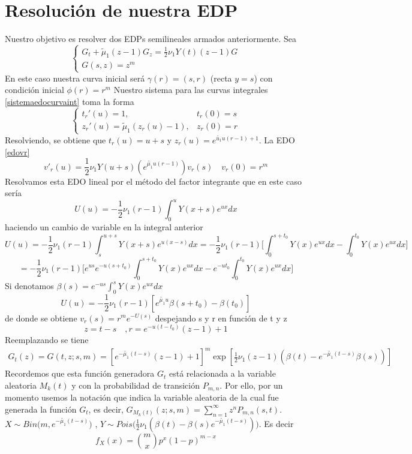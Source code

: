 \section{Resolución de nuestra EDP}
Nuestro objetivo es resolver dos EDPs semilineales armados anteriormente.
Sea 
$$\begin{cases}
    G_t+\tilde{\mu}_1(z-1)G_z=\frac{1}{2}\nu_1Y(t)(z-1)G\\G(s,z)=z^m
\end{cases}$$
En este caso nuestra curva inicial será $\gamma(r)=(s,r)$ (recta $y=s$) con condición inicial $\phi(r)=r^m$
Nuestro sistema para las curvas integrales \ref{sistemaedocurvaint} toma la forma
$$\begin{cases}
    t_r'(u)=1, & t_r(0)=s\\
    z_r'(u)=\tilde{\mu}_1(z_r(u)-1), & z_r(0)=r
\end{cases}$$
Resolviendo, se obtiene que $t_r(u)=u+s$ y $z_r(u)=e^{\tilde{u_1}u(r-1)+1}$.
La EDO \ref{edovr} 
$$v'_r(u)=\frac{1}{2}\nu_1Y(u+s)(e^{\tilde{\mu_1}u(r-1)}) v_r(s)\quad v_r(0)=r^m$$
Resolvamos esta EDO lineal por el método del factor integrante que en este caso sería $$U(u)=-\frac{1}{2}\nu_1(r-1)\int_0^uY(x+s)e^{ux}dx$$
haciendo un cambio de variable en la integral anterior
$$U(u)=-\frac{1}{2}\nu_1(r-1)\int_{s}^{u+s}Y(x+s)e^{u(x-s)}dx=-\frac{1}{2}\nu_1(r-1)\bigg[\int_0^{s+t_0}Y(x)e^{ux}dx-\int_0^{t_0}Y(x)e^{ux}dx\bigg]$$
$$=-\frac{1}{2}\nu_1(r-1)\bigg[e^{us}e^{-u(s+t_0)}\int_0^{s+t_0}Y(x)e^{ux}dx-e^{-ut_0}\int_0^{t_0}Y(x)e^{ux}dx\bigg]$$
Si denotamos $\beta(s)=e^{-us}\int_0^sY(x)e^{ux}dx$
$$U(u)=-\frac{1}{2}\nu_1(r-1)[e^{\tilde{\mu_1}u}\beta(s+t_0)-\beta(t_0)]$$
de donde se obtiene $v_r(s)=r^me^{-U(s)}$
despejando s y r en función de t y z
$$z=t-s\quad,r=e^{-u(t-t_0)}(z-1)+1$$
Reemplazando se tiene
\begin{eqnarray}
    G_t(z)=G(t,z; s,m)=[e^{-\tilde{\mu_1}(t-s)}(z-1)+1]^m \exp[\frac{1}{2}\nu_1(z-1)(\beta(t)-e^{-\tilde{\mu_1}(t-s)}\beta(s))]\label{gmk}
\end{eqnarray}
Recordemos que esta función generadora $G_t$ está relacionada a la variable aleatoria $M_k(t)$ y con la probabilidad de transición $P_{m,n}$.
Por ello, por un momento usemos la notación que indica la variable aleatoria de la cual fue generada la función $G_t$, es decir, $G_{M_k(t)}(z; s,m)=\sum_{n=1}^\infty z^n P_{m,n}(s,t)$.\\ $X\sim Bin\big(m,e^{-\tilde{\mu_1}(t-s)}\big)$ , $Y\sim Pois\big(\frac{1}{2}\nu_1(\beta(t)-\beta(s)e^{-\tilde{\mu_1}(t-s)})\big)$.
Es decir $$f_X(x)={m \choose x}p^x(1-p)^{m-x}$$

